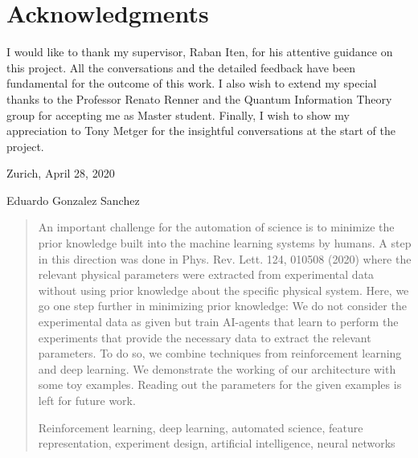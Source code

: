 \documentclass[11pt,a4paper,twoside]{report}
\newcommand{\+}{\textnormal{+} }
\theoremstyle{definition}
\numberwithin{equation}{chapter}
\begin{document}
%
%
%
\chapter*{Acknowledgments}
I would like to thank my supervisor, Raban Iten, for his attentive guidance on
this project. All the conversations and the detailed feedback have 
been fundamental for the outcome of this work. I also wish to extend my special
thanks to the Professor Renato Renner and the Quantum Information Theory group
for accepting me as Master student. Finally, I wish to show my appreciation to
Tony Metger for the insightful conversations at the start of the project.

\vspace{1.1cm}
\noindent
Zurich,  April 28, 2020

\vspace{2.4cm}
\noindent
Eduardo Gonzalez Sanchez
\thispagestyle{plain}
\clearpage

\thispagestyle{plain}
\cleardoublepage
%
%
%
\huge
\begin{abstract}
  \setcounter{page}{5}
\thispagestyle{plain}
  \normalsize
  \vspace{0.5cm}


\noindent An important challenge for the automation of science is to minimize
the prior knowledge built into the machine learning systems by humans. A step in
this direction was done in Phys. Rev. Lett. 124, 010508 (2020) where the
relevant physical parameters were extracted from experimental data without using
prior knowledge about the specific physical system. Here, we go one step further
in minimizing prior knowledge: We do not consider the experimental data as given
but train AI-agents that learn to perform the experiments that provide the
necessary data to extract the relevant parameters. To do so, we combine
techniques from reinforcement learning and deep learning. We demonstrate the
working of our architecture with some toy examples. Reading out the parameters
for the given examples is left for future work.
\vspace{3mm}

\noindent 

\vspace{10mm}
Reinforcement learning, deep learning, automated science, feature representation, 
experiment design, artificial intelligence, neural networks
\end{abstract}
\end{document}
